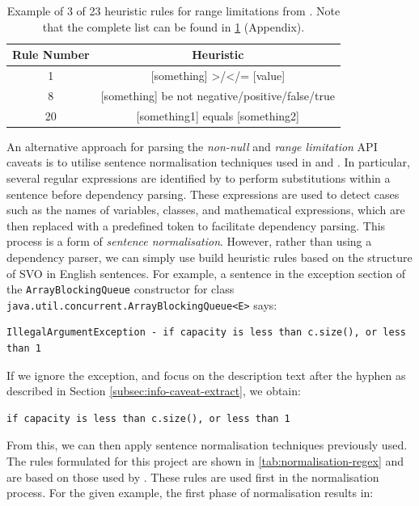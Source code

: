 \begin{table}[h]
	\centering
	\begin{tabular}{|cc|}
		\hline
		Rule Number & Heuristic \\ \hline
		1 & [something] >/</= [value] \\
		8 & [something] be {not} negative/positive/false/true \\
		20 & [something1] equals [something2] \\ \hline
	\end{tabular}
	\caption{Example of 3 of 23 heuristic rules for range limitations from \cite{zhou-directive}. Note that the complete list can be found in \ref{tab:range-limit-heuristic} (Appendix).}
	\label{tab:range-limit-heuristic}
\end{table}

An alternative approach for parsing the \textit{non-null} and \textit{range limitation} API caveats is to utilise sentence normalisation techniques used in \cite{zhou-directive} and \cite{blasi2018translating}. In particular, several regular expressions are identified by \citeauthor{zhou-directive} to perform substitutions within a sentence before dependency parsing. These expressions are used to detect cases such as the names of variables, classes, and mathematical expressions, which are then replaced with a predefined token to facilitate dependency parsing. This process is a form of \textit{sentence normalisation}. However, rather than using a dependency parser, we can simply use build heuristic rules based on the structure of SVO in English sentences. For example, a sentence in the exception section of the \lstinline{ArrayBlockingQueue} constructor for class \lstinline{java.util.concurrent.ArrayBlockingQueue<E>} says:

\begin{verbatim}
IllegalArgumentException - if capacity is less than c.size(), or less than 1
\end{verbatim}

If we ignore the exception, and focus on the description text after the hyphen as described in Section \ref{subsec:info-caveat-extract}, we obtain:

\begin{verbatim}
if capacity is less than c.size(), or less than 1
\end{verbatim}

From this, we can then apply sentence normalisation techniques previously used. The rules formulated for this project are shown in \ref{tab:normalisation-regex} and are based on those used by \cite{blasi2018translating}. These rules are used first in the normalisation process. For the given example, the first phase of normalisation results in:

